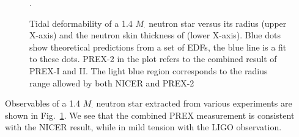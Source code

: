 \begin{figure}[!h]
    \centering
    \caption[Tidal deformability versus Rskin]
    {Tidal deformability of a 1.4 $M_\cdot$ neutron star versus its radius (upper X-axis)
    and the neutron skin thickness of \Pb (lower X-axis). Blue dots show theoretical
    predictions from a set of EDFs, the blue line is a fit to these dots. 
    PREX-2 in the plot refers to the combined result of PREX-I and II.
    The light blue region corresponds to the radius range allowed by both NICER and
    PREX-2 \cite{PhysRevLett.126.172503}}.
    \label{fig:neutron_star_radius}
\end{figure}

Observables of a 1.4 $M_\cdot$ neutron star extracted from various experiments
are shown in Fig.~\ref{fig:neutron_star_radius}. We see that the combined PREX 
measurement is consistent with the NICER result, while in mild tension with
the LIGO observation.

\begin{comment}
    \item Dipole polarizability of an atom $\sim R^3$
	$$ \kappa = \sum_f \frac{|\bra{f}rY_{10}\ket{i}|^2}{E_f - E_i} \propto R^3 $$
    \item Tidal deformability (quardupole polarizability) of a neutron star scales as $R^5$
	$$ \Lambda = \sum_f \frac{|\bra{f}r^2Y_{20}\ket{i}|^2}{E_f - E_i} \propto R^5 $$
    \item Next generation observer: cosmic explorer (https://arxiv.org/abs/2109.09882)
	can accurately determine deformability of neutron stars
\end{comment}

